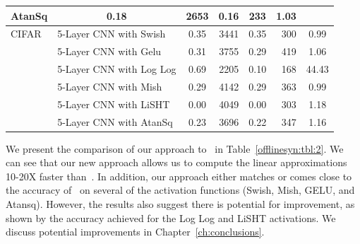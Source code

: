 \begin{table}[t]
{\begin{tabular}{|ll|cr|cr|c|}
			AtanSq                                 &
			\multicolumn{1}{c|}{0.18}            & 2653        &
			\multicolumn{1}{c|}{0.16}         & 233                           &
			1.03                                                 \\ \hline \hline
			\multicolumn{1}{|l|}{CIFAR} & 5-Layer CNN with
			Swish                                     &
			\multicolumn{1}{c|}{0.35}         & 3441       &
			\multicolumn{1}{c|}{0.35}         & 300                           &
			0.99                                              \\ \cline{2-7}
			\multicolumn{1}{|l|}{}      & 5-Layer CNN with
			Gelu                                      &
			\multicolumn{1}{c|}{0.31}         & 3755    &
			\multicolumn{1}{c|}{0.29}          & 419                           &
			1.06                                              \\ \cline{2-7}
			\multicolumn{1}{|l|}{}      & 5-Layer CNN with
			Log Log                                      &
			\multicolumn{1}{c|}{0.69}         & 2205    &
			\multicolumn{1}{c|}{0.10}          & 168                           &
			44.43                                              \\ \cline{2-7}
			\multicolumn{1}{|l|}{}      & 5-Layer CNN with
			Mish                                      &
			\multicolumn{1}{c|}{0.29}         & 4142      &
			\multicolumn{1}{c|}{0.29}         & 363                           &
			0.99                                              \\ \cline{2-7}
			\multicolumn{1}{|l|}{}      & 5-Layer CNN with
			LiSHT                                     &
			\multicolumn{1}{c|}{0.00}         & 4049       &
			\multicolumn{1}{c|}{0.00}          & 303                           &
			1.18                                              \\ \cline{2-7}
			\multicolumn{1}{|l|}{}      & 5-Layer CNN with
			AtanSq                                    &
			\multicolumn{1}{c|}{0.23}            & 3696        &
			\multicolumn{1}{c|}{0.22}          & 347                           &
			1.16                                                 \\ \hline
		\end{tabular}
	}

\end{table}

We present the comparison of our approach to~\linsyn{} in
Table~\ref{offlinesyn:tbl:2}. We can see that our new approach allows us to
compute the linear approximations 10-20X faster than~\linsyn{}. In addition, our
approach either matches or comes close to the accuracy of~\linsyn{} on several of
the activation functions (Swish, Mish, GELU, and Atansq). However, the results
also
suggest there is potential for improvement, as shown by the accuracy achieved for
the Log Log and LiSHT activations. We discuss potential improvements in
Chapter~\ref{ch:conclusions}.

